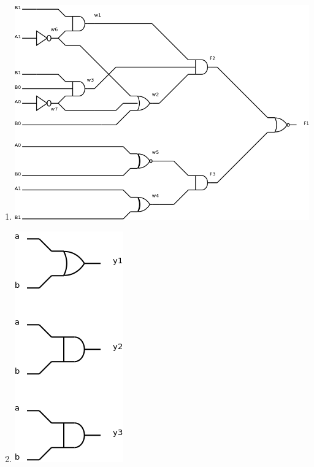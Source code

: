 \begin{enumerate}
\hfill
\item[\textbf{\en{iiib.}}]
\hfill
\begin{center}
\includegraphics[width=.5\textwidth, center]{Diagram3.png}
\end{center}

\hfill
\item[\textbf{\en{iiic.}}]
\hfill
\begin{center}
\includegraphics[width=.15\textwidth, center]{Diagram4.png}
\end{center}
\end{enumerate}
